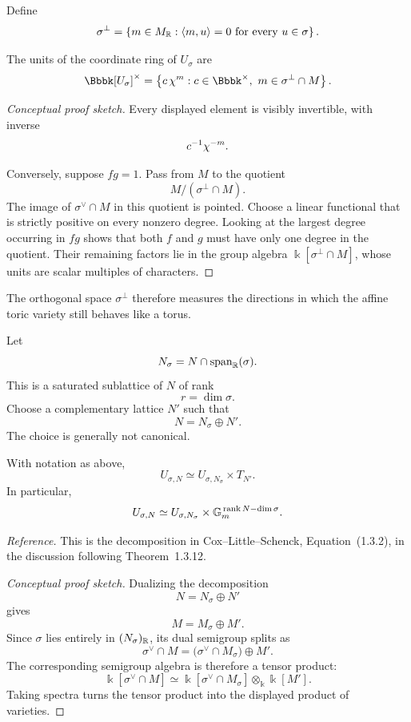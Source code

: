 Define
\[
\sigma^\perp
=
\left\{
m\in M_{\mathbb{R}}:
\left\langle m,u\right\rangle=0
\text{ for every }u\in\sigma
\right\}.
\]

\begin{proposition}[Units]
\label{prop:units-affine-toric-coordinate-ring}
The units of the coordinate ring of \(U_\sigma\) are
\[
\Bbbk[U_\sigma]^\times
=
\left\{
c\,\character{m}:
c\in\Bbbk^\times,\ 
m\in\sigma^\perp\cap M
\right\}.
\]
\end{proposition}

\begin{proof}[Conceptual proof sketch]
Every displayed element is visibly invertible, with inverse
\[
c^{-1}\chi^{-m}.
\]

Conversely, suppose \(fg=1\). Pass from \(M\) to the quotient
\[
M/(\sigma^\perp\cap M).
\]
The image of \(\sigma^\vee\cap M\) in this quotient is pointed. Choose
a linear functional that is strictly positive on every nonzero
degree. Looking at the largest degree occurring in \(fg\) shows that
both \(f\) and \(g\) must have only one degree in the quotient.
Their remaining factors lie in the group algebra
\(\Bbbk[\sigma^\perp\cap M]\), whose units are scalar multiples of
characters.
\end{proof}

The orthogonal space \(\sigma^\perp\) therefore measures the
directions in which the affine toric variety still behaves like a
torus.

Let
\[
N_\sigma
=
N\cap\operatorname{span}_{\mathbb{R}}(\sigma).
\]
This is a saturated sublattice of \(N\) of rank
\[
r=\dim\sigma.
\]
Choose a complementary lattice \(N'\) such that
\[
N=N_\sigma\oplus N'.
\]
The choice is generally not canonical.

\begin{proposition}
\label{prop:affine-toric-torus-factor}
With notation as above,
\[
U_{\sigma,N}
\simeq
U_{\sigma,N_\sigma}\times T_{N'}.
\]
In particular,
\[
U_{\sigma,N}
\simeq
U_{\sigma,N_\sigma}\times\mathbb{G}_{m}^{\,\operatorname{rank} N-\dim\sigma}.
\]
\end{proposition}

\noindent
\textit{Reference.}
This is the decomposition in Cox--Little--Schenck,
Equation~(1.3.2), in the discussion following Theorem~1.3.12.

\begin{proof}[Conceptual proof sketch]
Dualizing the decomposition
\[
N=N_\sigma\oplus N'
\]
gives
\[
M=M_\sigma\oplus M'.
\]
Since \(\sigma\) lies entirely in \((N_\sigma)_{\mathbb{R}}\), its dual
semigroup splits as
\[
\sigma^\vee\cap M
=
\bigl(\sigma^\vee\cap M_\sigma\bigr)\oplus M'.
\]
The corresponding semigroup algebra is therefore a tensor product:
\[
\Bbbk[\sigma^\vee\cap M]
\simeq
\Bbbk[\sigma^\vee\cap M_\sigma]\otimes_\Bbbk\Bbbk[M'].
\]
Taking spectra turns the tensor product into the displayed product of
varieties.
\end{proof}

